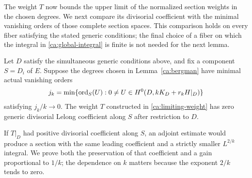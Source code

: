 The weight $T$ now bounds the upper limit of the normalized section
weights in the chosen degrees. We next compare its divisorial coefficient with the minimal
vanishing orders of those complete section spaces. This comparison
holds on every fiber satisfying the stated generic conditions;
the final choice of a fiber on which the integral in
\eqref{ca:global-integral} is finite is not needed for the next lemma.

\begin{lemma}\label{ca:jet}
Let \(D\) satisfy the simultaneous generic conditions above, and fix
a component \(S=D_i\) of \(E\).  Suppose the degrees chosen in
Lemma~\ref{ca:bergman} have minimal actual
vanishing orders
\[
 j_k=\min\{\operatorname{ord}_S(U):0\ne U\in
                  H^0(D,kK_D+r_kH|_D)\}
\]
satisfying \(j_k/k\to0\).  The weight \(T\) constructed in
\eqref{ca:limiting-weight} has zero generic divisorial Lelong
coefficient along \(S\) after restriction to \(D\).
\end{lemma}

If $T|_D$ had positive divisorial coefficient along $S$, an adjoint
estimate would produce a section with the same leading coefficient
and a strictly smaller $L^{2/k}$ integral. We prove both the
preservation of that coefficient and a gain proportional to $1/k$;
the dependence on $k$ matters because the exponent $2/k$ tends to zero.

